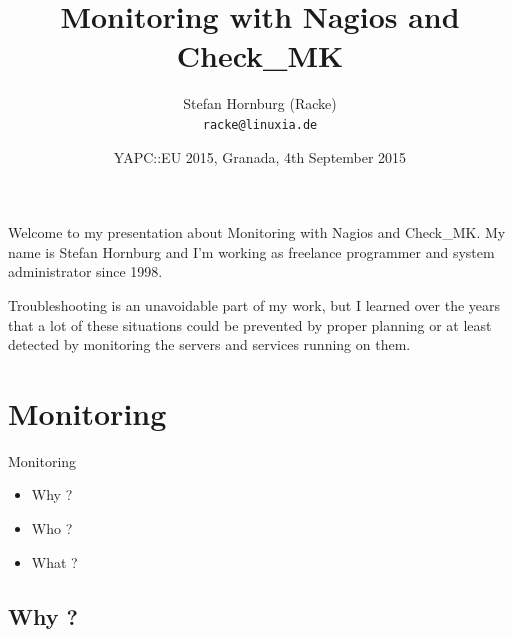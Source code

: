 \usepackage[utf8]{inputenc}
\usepackage[T1]{fontenc}
\usepackage{mathptmx}
\usepackage[scaled=.90]{helvet}
\usepackage{courier}
\usepackage{caption}
\captionsetup{labelformat=empty,labelsep=none}
\usepackage{verbatim}
\usepackage{hyperref}
\usepackage{listings}
\usepackage{ulem}
\lstset{language=Perl,basicstyle=\normalsize,tabsize=3,showstringspaces=false}

\title{Monitoring with Nagios and Check\_MK}
\author[racke]{Stefan Hornburg (Racke)\\ \texttt{racke@linuxia.de}}
\date{YAPC::EU 2015, Granada, 4th September 2015}


\maketitle{}

\begin{frame}
  \titlepage
\end{frame}

\tableofcontents


Welcome to my presentation about Monitoring with Nagios and Check\_MK.
My name is Stefan Hornburg and I'm working as freelance programmer
and system administrator since 1998.

Troubleshooting is an unavoidable part of my work, but I learned
over the years that a lot of these situations could be prevented
by proper planning or at least detected by monitoring the servers
and services running on them.


\section{Monitoring}

\begin{frame}[fragile]{Monitoring}

\begin{itemize}
\item Why ?
\item Who ?
\item What ?
\end{itemize}
\end{frame}

\subsection{Why ?}

